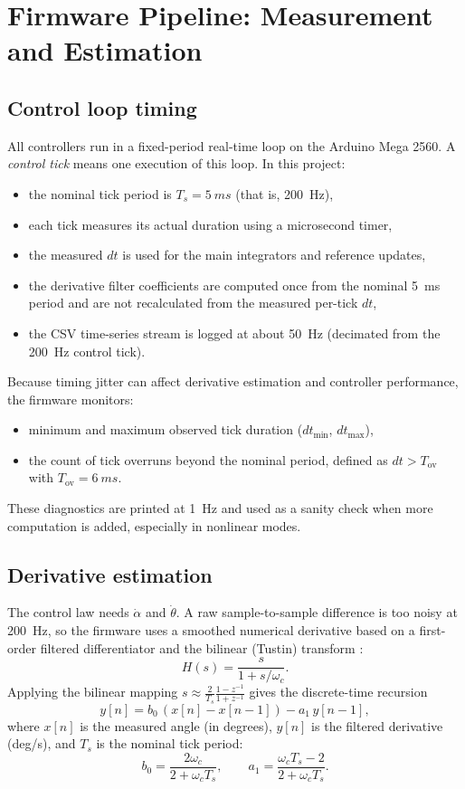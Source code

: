 \chapter{Firmware Pipeline: Measurement and Estimation}
\label{ch:measurement}

\section{Control loop timing}
All controllers run in a fixed-period real-time loop on the Arduino Mega 2560. A \emph{control tick} means one execution of this loop. In this project:
\begin{itemize}
  \item the nominal tick period is $T_s=\SI{5}{ms}$ (that is, \SI{200}{Hz}),
  \item each tick measures its actual duration using a microsecond timer,
  \item the measured $dt$ is used for the main integrators and reference updates,
  \item the derivative filter coefficients are computed once from the nominal \SI{5}{ms} period and are not recalculated from the measured per-tick $dt$,
  \item the CSV time-series stream is logged at about \SI{50}{Hz} (decimated from the \SI{200}{Hz} control tick).
\end{itemize}

Because timing jitter can affect derivative estimation and controller performance, the firmware monitors:
\begin{itemize}
  \item minimum and maximum observed tick duration ($dt_{\min}$, $dt_{\max}$),
  \item the count of tick overruns beyond the nominal period, defined as $dt > T_{\mathrm{ov}}$ with $T_{\mathrm{ov}}=\SI{6}{ms}$.
\end{itemize}
These diagnostics are printed at \SI{1}{Hz} and used as a sanity check when more computation is added, especially in nonlinear modes.

\section{Derivative estimation}
The control law needs $\dot{\alpha}$ and $\dot{\theta}$. A raw sample-to-sample difference is too noisy at \SI{200}{Hz}, so the firmware uses a smoothed numerical derivative based on a first-order filtered differentiator and the bilinear (Tustin) transform \cite{Astrom2008,ST_RIP_2019}:
\[
H(s) = \frac{s}{1+s/\omega_c}.
\]
Applying the bilinear mapping $s \approx \frac{2}{T_s}\frac{1-z^{-1}}{1+z^{-1}}$ gives the discrete-time recursion
\[
y[n] = b_0\,(x[n]-x[n-1]) - a_1\,y[n-1],
\]
where $x[n]$ is the measured angle (in degrees), $y[n]$ is the filtered derivative (deg/s), and $T_s$ is the nominal tick period:
\[
b_0 = \frac{2\omega_c}{2+\omega_c T_s},\qquad
a_1 = \frac{\omega_c T_s - 2}{2+\omega_c T_s}.
\]

